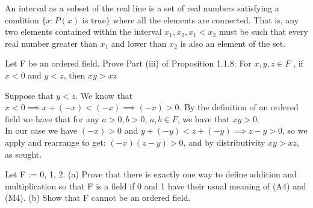 \documentclass[11 pt]{article}
\begin{document}
\begin{solution}
	An interval as a subset of the real line is a set of real numbers satisfying a condition $\{x:P(x) \text{ is true}\}$ where all the elements are connected. That is, any two elements contained within the interval $x_1, x_2, x_1<x_2$ must be such that every real number greater than $x_1$ and lower than $x_2$ is also an element of the set.
\end{solution}
\pagebreak
\begin{problem}
Let F be an ordered field. Prove Part (iii) of Proposition 1.1.8: For $x,y,z\in F$ ,
if $x < 0$ and $y < z$, then $xy > xz$
\end{problem}
\begin{solution}
	Suppose that $y<z$. We know that  $x<0\implies x+(-x)<(-x)\implies(-x)>0$. By the definition of an ordered field we have that for any $a>0, b>0$,  $a,b\in F$, we have that  $xy>0$.\\
	In our case we have  $(-x)>0$ and $y+(-y)<z+(-y)\implies z-y>0$, so we apply and rearrange to get:
$(-x)(z-y)>0$, and by distributivity $xy>xz$, as sought.
\end{solution}
\pagebreak
\begin{problem}
Let F := {0, 1, 2}.
(a) Prove that there is exactly one way to define addition and multiplication so that
F is a field if 0 and 1 have their usual meaning of (A4) and (M4).
(b) Show that F cannot be an ordered field.
\end{problem}
\end{document}
